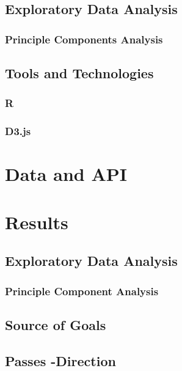 \documentclass[a4paper,11pt]{article}
\begin{document}
\subsection{Exploratory Data Analysis} %


\subsubsection{Principle Components Analysis}


\subsection{Tools and Technologies} %
\subsubsection{R} %


\subsubsection{D3.js} %

\section{Data and API}

\section{Results}
\subsection{Exploratory Data Analysis}

\subsubsection{Principle Component Analysis}

\label{sec:PCA}

\subsection{Source of Goals}


\subsection{Passes -Direction}

\end{document}
